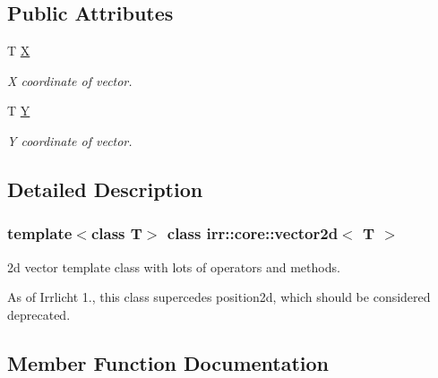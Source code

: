 \subsection*{Public Attributes}
\begin{DoxyCompactItemize}
\item 
\mbox{\label{classirr_1_1core_1_1vector2d_a8fabb0d10a3dd33b407b63bb3539be4d}} 
T \hyperlink{classirr_1_1core_1_1vector2d_a8fabb0d10a3dd33b407b63bb3539be4d}{X}
\begin{DoxyCompactList}\small\item\em X coordinate of vector. \end{DoxyCompactList}\item 
\mbox{\label{classirr_1_1core_1_1vector2d_aa4d36f518d3fc35a7aafcea33a31f76c}} 
T \hyperlink{classirr_1_1core_1_1vector2d_aa4d36f518d3fc35a7aafcea33a31f76c}{Y}
\begin{DoxyCompactList}\small\item\em Y coordinate of vector. \end{DoxyCompactList}\end{DoxyCompactItemize}


\subsection{Detailed Description}
\subsubsection*{template$<$class T$>$\newline
class irr\+::core\+::vector2d$<$ T $>$}

2d vector template class with lots of operators and methods. 

As of Irrlicht 1., this class supercedes position2d, which should be considered deprecated. 

\subsection{Member Function Documentation}
\mbox{\label{classirr_1_1core_1_1vector2d_acf2fea122833c456c6dd66811acc8b91}} 
